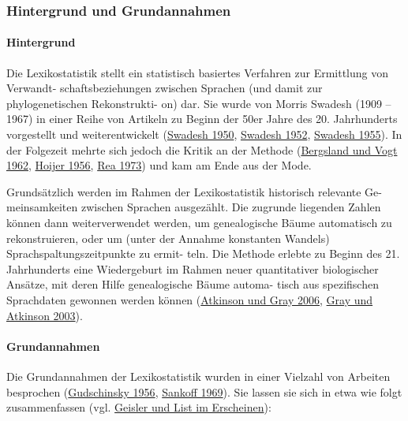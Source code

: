 \subsubsection{\texorpdfstring{{Hintergrund und
Grundannahmen}}{Hintergrund und Grundannahmen}}

\paragraph{Hintergrund}

Die Lexikostatistik stellt ein statistisch basiertes Verfahren zur
Ermittlung von Verwandt- schaftsbeziehungen zwischen Sprachen (und damit
zur phylogenetischen Rekonstrukti- on) dar. Sie wurde von Morris Swadesh
(1909 -- 1967) in einer Reihe von Artikeln zu Beginn der 50er Jahre des
20. Jahrhunderts vorgestellt und weiterentwickelt
(\href{http://bibliography.lingpy.org?key=Swadesh1950}{Swadesh 1950},
\href{http://bibliography.lingpy.org?key=Swadesh1952}{Swadesh 1952},
\href{http://bibliography.lingpy.org?key=Swadesh1955}{Swadesh 1955}). In
der Folgezeit mehrte sich jedoch die Kritik an der Methode
(\href{http://bibliography.lingpy.org?key=Bergsland1962}{Bergsland und
Vogt 1962}, \href{http://bibliography.lingpy.org?key=Hoijer1956}{Hoijer
1956}, \href{http://bibliography.lingpy.org?key=Rea1973}{Rea 1973}) und
kam am Ende aus der Mode.




Grundsätzlich werden im Rahmen der Lexikostatistik historisch relevante
Ge- meinsamkeiten zwischen Sprachen ausgezählt. Die zugrunde liegenden
Zahlen können dann weiterverwendet werden, um genealogische Bäume
automatisch zu rekonstruieren, oder um (unter der Annahme konstanten
Wandels) Sprachspaltungszeitpunkte zu ermit- teln. Die Methode erlebte
zu Beginn des 21. Jahrhunderts eine Wiedergeburt im Rahmen neuer
quantitativer biologischer Ansätze, mit deren Hilfe genealogische Bäume
automa- tisch aus spezifischen Sprachdaten gewonnen werden können
(\href{http://bibliography.lingpy.org?key=Atkinson2006}{Atkinson und
Gray 2006}, \href{http://bibliography.lingpy.org?key=Gray2003}{Gray und
Atkinson 2003}).



\paragraph{Grundannahmen}

Die Grundannahmen der Lexikostatistik wurden in einer Vielzahl von
Arbeiten besprochen
(\href{http://bibliography.lingpy.org?key=Gudschinsky1956}{Gudschinsky
1956}, \href{http://bibliography.lingpy.org?key=Sankoff1969}{Sankoff
1969}). Sie lassen sie sich in etwa wie folgt zusammenfassen (vgl.
\href{http://lingulist.de/jump.php?paper=Geisler2014\&href=documents/beautiful_trees.pdf}{Geisler
und List im Erscheinen}):

